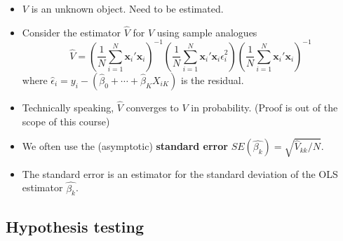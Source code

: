 \documentclass[]{book}
\providecommand{\tightlist}{%
  \setlength{\itemsep}{0pt}\setlength{\parskip}{0pt}}
\begin{document}
\begin{itemize}
\tightlist
\item
  \(V\) is an unknown object. Need to be estimated.
\item
  Consider the estimator \(\hat{V}\) for \(V\) using sample analogues
  \[
    \hat{V}=\left(\frac{1}{N}\sum_{i=1}^{N}\mathbf{x}_{i}'\mathbf{x}_{i}\right)^{-1}\left(\frac{1}{N}\sum_{i=1}^{N}\mathbf{x}_{i}'\mathbf{x}_{i}\hat{\epsilon}_{i}^{2}\right)\left(\frac{1}{N}\sum_{i=1}^{N}\mathbf{x}_{i}'\mathbf{x}_{i}\right)^{-1}
  \]
  where \(\hat{\epsilon}_i = y_i - (\hat{\beta}_0 + \cdots + \hat{\beta}_K X_{iK})\) is the residual.
\item
  Technically speaking, \(\hat{V}\) converges to \(V\) in probability. (Proof is out of the scope of this course)
\item
  We often use the (asymptotic) \textbf{standard error} \(SE(\hat{\beta_k}) = \sqrt{\hat{V}_{kk} / N }\).
\item
  The standard error is an estimator for the standard deviation of the OLS estimator \(\hat{\beta_k}\).
\end{itemize}

\hypertarget{hypothesis-testing-2}{%
\subsection{Hypothesis testing}\label{hypothesis-testing-2}}
\end{document}
